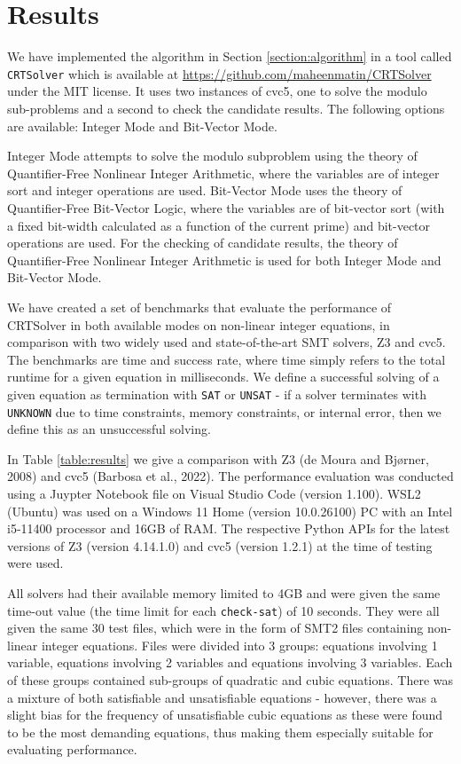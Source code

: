 \section{Results}
\label{section:results}

We have implemented the algorithm in Section \ref{section:algorithm}
in a tool called \texttt{CRTSolver} which is available at
\url{https://github.com/maheenmatin/CRTSolver} under the MIT license.
%
It uses two instances of cvc5, one to solve the modulo sub-problems
and a second to check the candidate results.  The following options
are available: Integer Mode and Bit-Vector Mode. 

Integer Mode attempts to
solve the modulo subproblem using the theory of Quantifier-Free Nonlinear
Integer Arithmetic, where the variables are of integer sort and integer
operations are used. 
Bit-Vector Mode uses the theory of Quantifier-Free
Bit-Vector Logic, where the variables are of bit-vector sort (with a fixed
bit-width calculated as a function of the current prime) and bit-vector
operations are used.
For the checking of candidate results, the theory of Quantifier-Free
Nonlinear Integer Arithmetic is used for both Integer Mode and Bit-Vector
Mode.

We have created a set of benchmarks that evaluate the performance of CRTSolver 
in both available modes on non-linear integer equations, in comparison with two
widely used and state-of-the-art SMT solvers, Z3 and cvc5.
The benchmarks are time and success rate, where time simply refers to the total runtime
for a given equation in milliseconds. We define a successful solving of a given
equation as termination with \texttt{SAT} or \texttt{UNSAT} - if a solver terminates
with \texttt{UNKNOWN} due to time constraints, memory constraints, or internal error,
then we define this as an unsuccessful solving.



In Table \ref{table:results} we give a comparison with Z3 (de Moura and Bj{\o}rner, 2008) and 
cvc5 (Barbosa et al., 2022). 
The performance evaluation was conducted using a Juypter Notebook file on Visual Studio Code (version 1.100).
WSL2 (Ubuntu) was used on a Windows 11 Home (version 10.0.26100) PC with an Intel i5-11400 processor and 
16GB of RAM. The respective Python APIs for the latest versions of Z3 (version 4.14.1.0) and cvc5 
(version 1.2.1) at the time of testing were used.

All solvers had their available memory limited to 4GB and were given the same time-out value 
(the time limit for each \texttt{check-sat}) of 10 seconds. They were all given the same 30 test 
files, which were in the form of SMT2 files containing non-linear integer equations. Files were divided into 3 
groups: equations involving 1 variable, equations involving 2 variables and equations involving 3 variables. 
Each of these groups contained sub-groups of quadratic and cubic equations. There was a mixture of both 
satisfiable and unsatisfiable equations - however, there was a slight bias for the frequency of unsatisfiable 
cubic equations as these were found to be the most demanding equations, thus making them especially suitable 
for evaluating performance.

